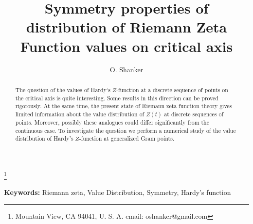 \documentclass{amsart}
\theoremstyle{definition}
\theoremstyle{remark}
\numberwithin{equation}{section}
\begin{document}
\title{Symmetry properties of distribution of Riemann Zeta Function values on critical axis}


\author{O. Shanker}
\thanks{ Mountain View, CA 94041, U. S. A.
email: oshanker@gmail.com}



\date{}
\maketitle


\begin{abstract}
The question of the values of Hardy's $Z$-function at a discrete sequence of points on the critical axis is quite interesting. Some results in this direction can be proved rigorously. At the same time, the present state of Riemann zeta function theory gives limited information about the value distribution of $Z(t)$ at discrete sequences of points. Moreover, possibly these analogues could differ significantly from the continuous case. To investigate the question we perform a numerical study of the value distribution of Hardy's $Z$-function at generalized Gram points. 

\end{abstract}
{\bf Keywords:} Riemann zeta, Value Distribution, Symmetry, Hardy's function







\end{document}
